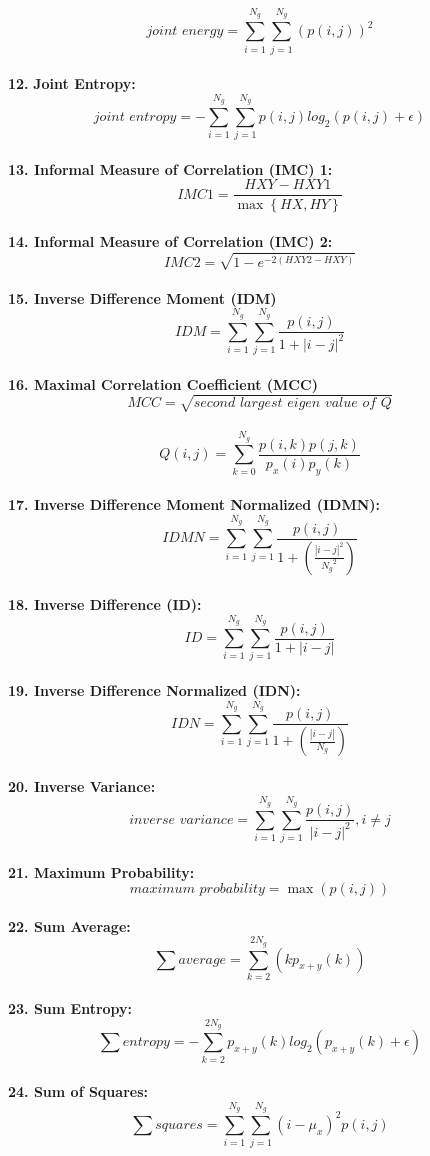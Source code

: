 \[\textit{joint energy}=\sum _{i=1}^{N_{g}}\sum _{j=1}^{N_{g}}\left(p\left(i,j\right)\right)^{2}\]\\
\textbf{12.} \textbf{Joint Entropy:}\\
\[\textit{joint entropy}=-\sum _{i=1}^{N_{g}}\sum _{j=1}^{N_{g}}p\left(i,j\right)log_{2}\left(p\left(i,j\right)+\epsilon \right)\]\\
\textbf{13. Informal Measure of Correlation (IMC) 1:}\\
\[IMC1=\frac{HXY-HXY1}{\max \left\{HX,HY\right\}}\]\\
\textbf{14. Informal Measure of Correlation (IMC) 2:}\\
\[IMC2=\sqrt{1-e^{-2\left(HXY2-HXY\right)}}\]\\
\textbf{15. Inverse Difference Moment (IDM)}\\
\[IDM=\sum _{i=1}^{N_{g}}\sum _{j=1}^{N_{g}}\frac{p\left(i,j\right)}{1+\left| i-j\right| ^{2}}\]\\
\textbf{16. Maximal Correlation Coefficient (MCC)}\\
\[MCC=\sqrt{\textit{second largest eigen value of Q}}\]\\
\[Q\left(i,j\right)=\sum _{k=0}^{N_{g}}\frac{p\left(i,k\right)p\left(j,k\right)}{p_{x}\left(i\right)p_{y}\left(k\right)}\]\\
\textbf{17. Inverse Difference Moment Normalized (IDMN):}\\
\[IDMN=\sum _{i=1}^{N_{g}}\sum _{j=1}^{N_{g}}\frac{p\left(i,j\right)}{1+\left(\frac{\left| i-j\right| ^{2}}{{N_{g}}^{2}}\right)}\]\\
\textbf{18. Inverse Difference (ID):}\\
\[ID=\sum _{i=1}^{N_{g}}\sum _{j=1}^{N_{g}}\frac{p\left(i,j\right)}{1+\left| i-j\right| }\]\\
\textbf{19. Inverse Difference Normalized (IDN):}\\
\[IDN=\sum _{i=1}^{N_{g}}\sum _{j=1}^{N_{g}}\frac{p\left(i,j\right)}{1+\left(\frac{\left| i-j\right| }{N_{g}}\right)}\]\\
\textbf{20. Inverse Variance:}\\
\[\textit{inverse variance}=\sum _{i=1}^{N_{g}}\sum _{j=1}^{N_{g}}\frac{p\left(i,j\right)}{\left| i-j\right| ^{2}} ,i\neq j\]\\
\textbf{21. Maximum Probability:}\\
\[\textit{maximum probability}=\max \left(p\left(i,j\right)\right)\]\\
\textbf{22. Sum Average:}\\
\[\sum \textit{average}=\sum _{k=2}^{2N_{g}}\left(kp_{x+y}\left(k\right)\right)\]\\
\textbf{23. Sum Entropy:}\\
\[\sum \textit{entropy}=-\sum _{k=2}^{2N_{g}}p_{x+y}\left(k\right)log_{2}\left(p_{x+y}\left(k\right)+\epsilon \right)\]\\
\textbf{24. Sum of Squares:}\\
\[\sum \textit{squares}=\sum _{i=1}^{N_{g}}\sum _{j=1}^{N_{g}}\left(i-\mu _{x}\right)^{2}p\left(i,j\right)\]



